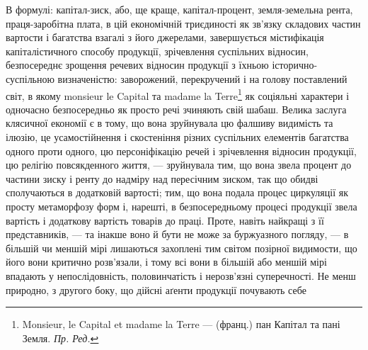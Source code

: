 В формулі: капітал-зиск, або, ще краще, капітал-процент, земля-земельна
рента, праця-заробітна плата, в цій економічній триєдиності як зв’язку
складових частин вартости і багатства взагалі з його джерелами, завершується
містифікація капіталістичного способу продукції, зрічевлення суспільних відносин,
безпосереднє зрощення речевих відносин продукції з їхньою історично-суспільною
визначеністю: заворожений, перекручений і на голову поставлений
світ, в якому monsieur le Capital та madame la Terre\footnote*{
Monsieur, le Capital et madame la Terre — (франц.) пан Капітал та пані Земля. \emph{Пр. Ред.}
} як соціяльні характери
і одночасно безпосередньо як просто речі зчиняють свій шабаш. Велика заслуга
клясичної економії є в тому, що вона зруйнувала цю фалшиву видимість
та ілюзію, це усамостійнення і скостеніння різних суспільних елементів
багатства одного проти одного, цю персоніфікацію речей і зрічевлення
відносин продукції, цю релігію повсякденного життя, — зруйнувала тим, що вона
звела процент до частини зиску і ренту до надміру над пересічним зиском, так
що обидві сполучаються в додатковій вартості; тим, що вона подала процес
циркуляції як просту метаморфозу форм і, нарешті, в безпосередньому процесі
продукції звела вартість і додаткову вартість товарів до праці. Проте, навіть
найкращі з її представників, — та інакше воно й бути не може за буржуазного
погляду, — в більшій чи меншій мірі лишаються захоплені тим світом позірної
видимости, що його вони критично розв’язали, і тому всі вони в більшій або меншій
мірі впадають у непослідовність, половинчатість і нерозв’язні суперечності.
Не менш природно, з другого боку, що дійсні аґенти продукції почувають себе
\parbreak{}  %
